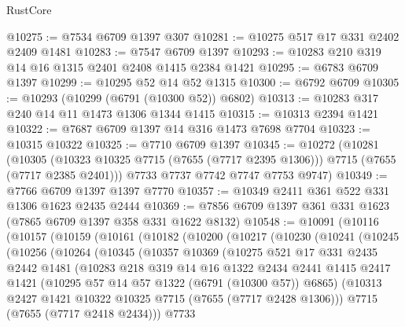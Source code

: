 \begin{lexlean}{RustCore}
\begin{coremodule}
@10275 := @7534 @6709 @1397 @307
@10281 := @10275 @517 @17 @331 @2402 @2409 @1481
@10283 := @7547 @6709 @1397
@10293 := @10283 @210 @319 @14 @16 @1315 @2401 @2408 @1415 @2384 @1421
@10295 := @6783 @6709 @1397
@10299 := @10295 @52 @14 @52 @1315
@10300 := @6792 @6709
@10305 := @10293 (@10299 (@6791 (@10300 @52)) @6802)
@10313 := @10283 @317 @240 @14 @11 @1473 @1306 @1344 @1415
@10315 := @10313 @2394 @1421
@10322 := @7687 @6709 @1397 @14 @316 @1473 @7698 @7704
@10323 := @10315 @10322
@10325 := @7710 @6709 @1397
@10345 := @10272
    (@10281
      (@10305 (@10323 @10325 @7715 (@7655 (@7717 @2395 @1306))) @7715 (@7655 (@7717 @2385 @2401)))
      @7733
      @7737
      @7742
      @7747
      @7753
      @9747)
@10349 := @7766 @6709 @1397 @1397 @7770
@10357 := @10349 @2411 @361 @522 @331 @1306 @1623 @2435 @2444
@10369 := @7856 @6709 @1397 @361 @331 @1623 (@7865 @6709 @1397 @358 @331 @1622 @8132)
@10548 := @10091
    (@10116
      (@10157
        (@10159
          (@10161
            (@10182
              (@10200
                (@10217
                  (@10230
                    (@10241
                      (@10245
                        (@10256
                          (@10264
                            (@10345
                              (@10357
                                @10369
                                (@10275
                                  @521
                                  @17
                                  @331
                                  @2435
                                  @2442
                                  @1481
                                  (@10283
                                    @218
                                    @319
                                    @14
                                    @16
                                    @1322
                                    @2434
                                    @2441
                                    @1415
                                    @2417
                                    @1421
                                    (@10295 @57 @14 @57 @1322 (@6791 (@10300 @57)) @6865)
                                    (@10313
                                      @2427
                                      @1421
                                      @10322
                                      @10325
                                      @7715
                                      (@7655 (@7717 @2428 @1306)))
                                    @7715
                                    (@7655 (@7717 @2418 @2434)))
                                  @7733

\end{coremodule}
\end{lexlean}
